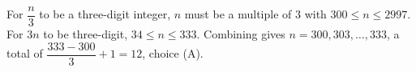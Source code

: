 For $\dfrac{n}{3}$ to be a three-digit integer, $n$ must be a multiple of $3$ with $300\le n\le2997$. For $3n$ to be three-digit, $34\le n\le333$. Combining gives $n=300,303,\ldots,333$, a total of $\dfrac{333-300}{3}+1=\boxed{12}$, choice (A).
